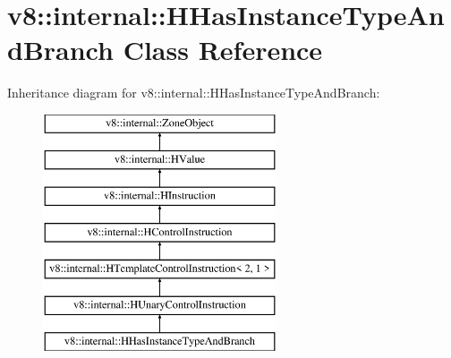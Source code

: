\hypertarget{classv8_1_1internal_1_1_h_has_instance_type_and_branch}{}\section{v8\+:\+:internal\+:\+:H\+Has\+Instance\+Type\+And\+Branch Class Reference}
\label{classv8_1_1internal_1_1_h_has_instance_type_and_branch}
Inheritance diagram for v8\+:\+:internal\+:\+:H\+Has\+Instance\+Type\+And\+Branch\+:\begin{figure}[H]
\begin{center}
\leavevmode
\includegraphics[height=7.000000cm]{classv8_1_1internal_1_1_h_has_instance_type_and_branch}
\end{center}
\end{figure}
